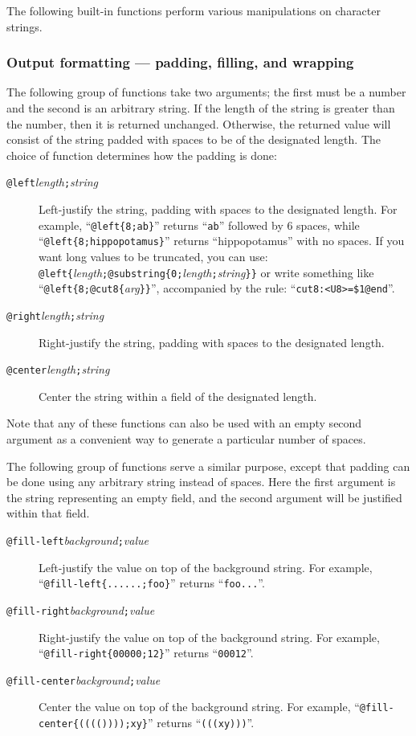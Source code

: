 The following built-in functions perform various manipulations on
character strings.

\subsubsection{Output formatting --- padding, filling, and wrapping}

The following group of functions take two arguments; the first must be a
number and the second is an arbitrary string.  If the length of the
string is greater than the number, then it is returned unchanged.
Otherwise, the returned value will consist of the string padded with
spaces to be of the designated length.  The choice of function
determines how the padding is done:
\begin{description}
\item[{\tt @left\ttlb}{\it length}{\tt ;}{\it string}{\tt \ttrb}]
Left-justify the string, padding with spaces to the designated length.
For example, ``\verb/@left{8;ab}/'' returns ``\verb/ab/'' followed by 6
spaces, while ``\verb/@left{8;hippopotamus}/'' returns ``hippopotamus''
with no spaces.  If you want long values to be truncated, you can 
use: \newline
\verb/  @left{/{\it length}\verb/;@substring{0;/{\it length}\verb/;/{\it string}\verb/}}/
\newline or write
something like ``\verb/@left{8;@cut8{/{\it arg}\verb/}}/'', accompanied
by the rule:  ``\verb/cut8:<U8>=$1@end/''.
\item[{\tt @right\ttlb}{\it length}{\tt ;}{\it string}{\tt \ttrb}]
Right-justify the string, padding with spaces to the designated length.
\item[{\tt @center\ttlb}{\it length}{\tt ;}{\it string}{\tt \ttrb}]
Center the string within a field of the designated length.
\end{description}
Note that any of these functions can also be used with an empty second
argument as a convenient way to generate a particular number of spaces.


The following group of functions serve a similar purpose, except that
padding can be done using any arbitrary string instead of spaces.  Here
the first argument is the string representing an empty field, and the
second argument will be justified within that field.
\begin{description}
\item[{\tt @fill-left\ttlb}{\it background}{\tt ;}{\it value}{\tt \ttrb}]
Left-justify the value on top of the background string.
For example, ``\verb/@fill-left{......;foo}/'' returns ``\verb/foo.../''.
\item[{\tt @fill-right\ttlb}{\it background}{\tt ;}{\it value}{\tt \ttrb}]
Right-justify the value on top of the background string.
For example, ``\verb/@fill-right{00000;12}/'' returns ``\verb/00012/''.
\item[{\tt @fill-center\ttlb}{\it background}{\tt ;}{\it value}{\tt \ttrb}]
Center the value on top of the background string.
For example, ``\verb/@fill-center{(((())));xy}/'' returns ``\verb/(((xy)))/''.
\end{description}


